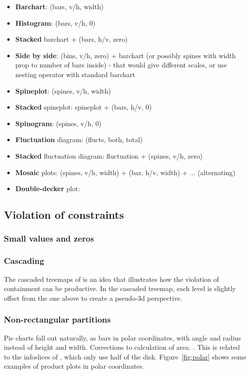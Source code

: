 \documentclass[letterpaper,oneside]{scrartcl}
\begin{document}
\begin{itemize}
  \item {\bf Barchart}: (bars, v/h, width)
  \item {\bf Histogram}: (bars, v/h, 0)
  \item {\bf Stacked} barchart + (bars, h/v, zero)
  \item {\bf Side by side}: (bins, v/h, zero) + barchart  (or possibly spines with width prop to number of bars inside) - that would  give different scales, or use nesting operator with standard barchart
  \item {\bf Spineplot}: (spines, v/h, width)
  \item {\bf Stacked} spineplot: spineplot + (bars, h/v, 0)
  \item {\bf Spinogram}: (spines, v/h, 0)
  \item {\bf Fluctuation} diagram: (flucts, both, total)
  \item {\bf Stacked} fluctuation diagram: fluctuation + (spines, v/h, zero)
  \item {\bf Mosaic} plots: (spines, v/h, width) + (bar, h/v, width) + ... (alternating)
  \item {\bf Double-decker} plot: 
\end{itemize}



\subsection{Violation of constraints}

\subsubsection{Small values and zeros}
\subsubsection{Cascading}

The cascaded treemaps of \citet{lu:2008} is an idea that illustrates how the violation of containment can be productive.  In the cascaded treemap, each level is slightly offset from the one above to create a pseudo-3d perspective.

\subsubsection{Non-rectangular partitions}

Pie charts fall out naturally, as bars in polar coordinates, with angle and radius instead of height and width. Corrections to calculation of area.  .  This is related to the infoslices of \citet{andrews:1998}, which only use half of the disk.  Figure~\ref{fig:polar} shows some examples of product plots in polar coordinates.
\end{document}
